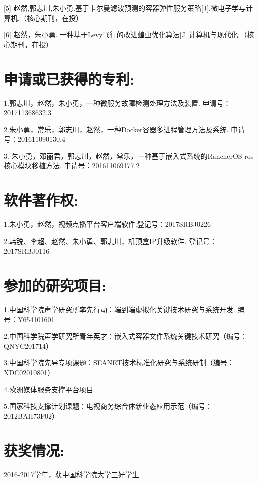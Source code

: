 [5] 赵然,郭志川,朱小勇.基于卡尔曼滤波预测的容器弹性服务策略[J].微电子学与计算机.（核心期刊，在投）

[6] 赵然，朱小勇. 一种基于Levy飞行的改进蝗虫优化算法[J].计算机与现代化.（核心期刊，在投）

\section*{申请或已获得的专利:}

1.郭志川，赵然，朱小勇，一种微服务故障检测处理方法及装置. 申请号：201711368632.3

2.朱小勇，常乐，郭志川，赵然，一种Docker容器多进程管理方法及系统. 申请号：201611090130.4

3. 朱小勇，邓丽君，郭志川，赵然，常乐，一种基于嵌入式系统的RancherOS ros核心模块移植方法. 申请号：201611069177.2

\section*{软件著作权:}

1.朱小勇，赵然，视频点播平台客户端软件.登记号：2017SRBJ0226

2.韩锐、李超、赵然、朱小勇、郭志川，机顶盒IP升级软件. 登记号：2017SRBJ0116

\section*{参加的研究项目:}

1.中国科学院声学研究所率先行动：端到端虚拟化关键技术研究与系统开发. 编号：Y654101601

2.中国科学院声学研究所青年英才：嵌入式容器文件系统关键技术研究（编号：QNYC201714）

3.中国科学院先导专项课题：SEANET技术标准化研究与系统研制（编号：XDC02010801）

4.欧洲媒体服务支撑平台项目

5.国家科技支撑计划课题：电视商务综合体新业态应用示范（编号：2012BAH73F02）

\section*{获奖情况:}
2016-2017学年，获中国科学院大学三好学生

\cleardoublepage[plain]%

